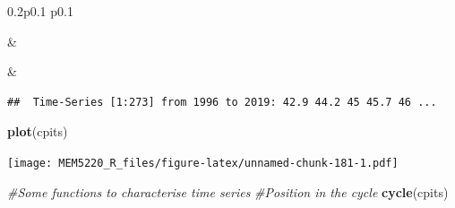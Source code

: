 \documentclass[]{book}
\newenvironment{Shaded}{\begin{snugshade}}{\end{snugshade}}
\newcommand{\CommentTok}[1]{\textcolor[rgb]{0.56,0.35,0.01}{\textit{#1}}}
\newcommand{\DataTypeTok}[1]{\textcolor[rgb]{0.13,0.29,0.53}{#1}}
\newcommand{\DecValTok}[1]{\textcolor[rgb]{0.00,0.00,0.81}{#1}}
\newcommand{\KeywordTok}[1]{\textcolor[rgb]{0.13,0.29,0.53}{\textbf{#1}}}
\newcommand{\NormalTok}[1]{#1}
\newcommand{\OperatorTok}[1]{\textcolor[rgb]{0.81,0.36,0.00}{\textbf{#1}}}
\newcommand{\StringTok}[1]{\textcolor[rgb]{0.31,0.60,0.02}{#1}}
\begin{document}
\begin{table}[h]
\begin{raggedright}
\begin{threeparttable}
\begin{tabularx}{0.2\textwidth}{p{} p{}}

 &
 \tabularnewline[-0.5pt]



 &
 \tabularnewline[-0.5pt]


\end{tabularx}\end{threeparttable}
\par\end{raggedright}

\end{table}
 

\begin{Shaded}
\end{Shaded}

\begin{verbatim}
##  Time-Series [1:273] from 1996 to 2019: 42.9 44.2 45 45.7 46 ...
\end{verbatim}

\begin{Shaded}
\begin{Highlighting}[]
\KeywordTok{plot}\NormalTok{(cpits)}
\end{Highlighting}
\end{Shaded}

\texttt{[image: MEM5220\_R\_files/figure-latex/unnamed-chunk-181-1.pdf]}

\begin{Shaded}
\begin{Highlighting}[]
\CommentTok{#Some functions to characterise time series}
\CommentTok{#Position in the cycle}
\KeywordTok{cycle}\NormalTok{(cpits)}
\end{Highlighting}
\end{Shaded}
\end{document}
